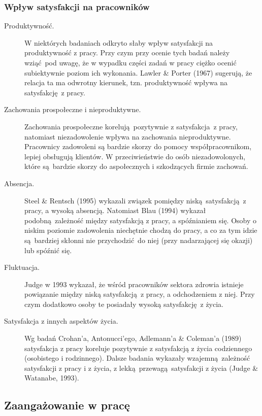 \subsubsection{Wpływ satysfakcji na pracowników}
\begin{description}
\item[Produktywność.] W niektórych badaniach odkryto słaby wpływ satysfakcji na produktywność z pracy. Przy czym przy ocenie tych badań należy wziąć pod uwagę, że w wypadku części zadań w pracy ciężko ocenić subiektywnie poziom ich wykonania. Lawler \& Porter (1967) sugerują, że relacja ta ma odwrotny kierunek, tzn. produktywność wpływa na satysfakcję z pracy.
\item[Zachowania prospołeczne i nieproduktywne.] Zachowania prospołeczne korelują pozytywnie z satysfakcja z pracy, natomiast niezadowolenie wpływa na zachowania nieproduktywne. Pracownicy zadowoleni są bardzie skorzy do pomocy współpracownikom, lepiej obsługują klientów. W przeciwieństwie do osób niezadowolonych, które są bardzie skorzy do aspołecznych i szkodzących firmie zachowań.
\item[Absencja.] Steel \& Rentsch (1995) wykazali związek pomiędzy niską satysfakcją z pracy, a wysoką absencją. Natomiast Blau (1994) wykazał podobną zależność między satysfakcją z pracy, a spóźnianiem się. Osoby o niskim poziomie zadowolenia niechętnie chodzą do pracy, a co za tym idzie są bardziej skłonni nie przychodzić do niej (przy nadarzającej się okazji) lub spóźnić się.
\item[Fluktuacja.] Judge w 1993 wykazał, że wśród pracowników sektora zdrowia istnieje powiązanie między niską satysfakcją z pracy, a odchodzeniem z niej. Przy czym dodatkowo osoby te posiadały wysoką satysfakcję z życia.
\item[Satysfakcja z innych aspektów życia.] Wg badań Crohan'a, Antonucci'ego, Adlemann'a \& Coleman'a (1989) satysfakcja z pracy koreluje pozytywnie z satysfakcją z życia codziennego (osobistego i rodzinnego). Dalsze badania wykazały wzajemną zależność satysfakcji z pracy i z życia, z lekką przewagą satysfakcji z życia (Judge \& Watanabe, 1993).
\end{description}
\subsection{Zaangażowanie w pracę}
